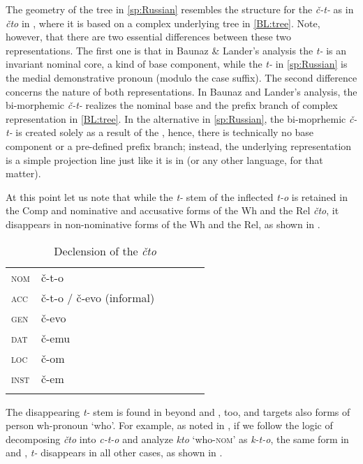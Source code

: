 The geometry of the tree in \ref{sp:Russian} resembles the structure for the  \textit{\v{c}-t-} as in  \textit{\v{c}to} in \cite{BaunazLander2018}, where it is based on a complex underlying tree in \ref{BL:tree}. Note, however, that there are two essential differences between these two representations. The first one is that in Baunaz \& Lander's analysis the  \textit{t-} is an invariant nominal core, a kind of base component, while the \textit{t-} in \ref{sp:Russian} is the medial demonstrative pronoun (modulo the case suffix). The second difference concerns the nature of both representations. In Baunaz and Lander's analysis, the bi-morphemic \textit{\v{c}-t-} realizes the nominal base and the prefix branch of complex representation in \ref{BL:tree}. In the alternative  in \ref{sp:Russian}, the bi-moprhemic \textit{\v{c}-t-} is created solely as a result of the , hence, there is technically no base component or a pre-defined prefix branch; instead, the underlying representation is a simple projection line just like it is in  (or any other language, for that matter).
\par At this point let us note that while the \textit{t-} stem of the inflected  \textit{t-o} is retained in the  Comp and nominative and accusative forms of the Wh and the Rel \textit{\v{c}to}, it disappears in non-nominative forms of the Wh and the Rel, as shown in .

\begin{table}
\caption{Declension of the  \textit{\v{c}to}}
\label{tab:ruskie} 
\begin{tabular}[t]{ l l l l l l }
\lsptoprule	
  \textsc{nom} & \v{c}-t-o\\
  \textsc{acc}  & \v{c}-t-o / \v{c}-evo (informal)\\
  \textsc{gen} & \v{c}-evo\\
  \textsc{dat} & \v{c}-emu\\
  \textsc{loc}  & \v{c}-om\\
  \textsc{inst} & \v{c}-em\\
  \lspbottomrule
\end{tabular}
\end{table}

The disappearing \textit{t-} stem is found in  beyond  and , too, and targets also forms of person wh-pronoun `who'. For example, as noted in \cite{Wiland-PSiCL}, if we follow the logic of decomposing \textit{\v{c}to} into \textit{c-t-o} and analyze \textit{kto} `who-\textsc{nom}' as \textit{k-t-o}, the same form in  and , \textit{t-} disappears in all other cases, as shown in .

